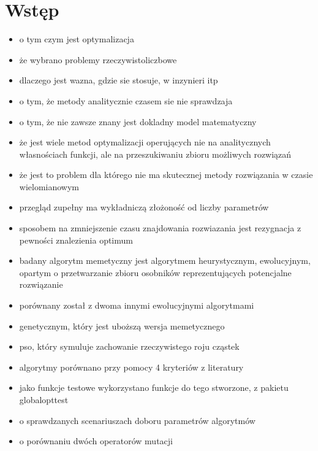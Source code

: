 \chapter*{Wstęp}

\begin{itemize}
\item o tym czym jest optymalizacja
\item że wybrano problemy rzeczywistoliczbowe
\item dlaczego jest wazna, gdzie sie stosuje, w inzynieri itp
\item o tym, że metody analitycznie czasem sie nie sprawdzaja
\item o tym, że nie zawsze znany jest dokladny model matematyczny
\item że jest wiele metod optymalizacji operujących nie na analitycznych własnościach funkcji, ale na przeszukiwaniu zbioru możliwych rozwiązań
\item że jest to problem dla którego nie ma skutecznej metody rozwiązania w czasie wielomianowym
\item przegląd zupełny ma wykładniczą złożoność od liczby parametrów
\item sposobem na zmniejszenie czasu znajdowania rozwiazania jest rezygnacja z pewności znalezienia optimum
\item badany algorytm memetyczny jest algorytmem heurystycznym, ewolucyjnym, opartym o przetwarzanie zbioru osobników reprezentujących potencjalne rozwiązanie
\item porównany został z dwoma innymi ewolucyjnymi algorytmami
\item genetycznym, który jest uboższą wersja memetycznego
\item pso, który symuluje zachowanie rzeczywistego roju cząstek
\item algorytmy porównano przy pomocy 4 kryteriów z literatury
\item jako funkcje testowe wykorzystano funkcje do tego stworzone, z pakietu globalopttest
\item o sprawdzanych scenariuszach doboru parametrów algorytmów
\item o porównaniu dwóch operatorów mutacji

\end{itemize}

